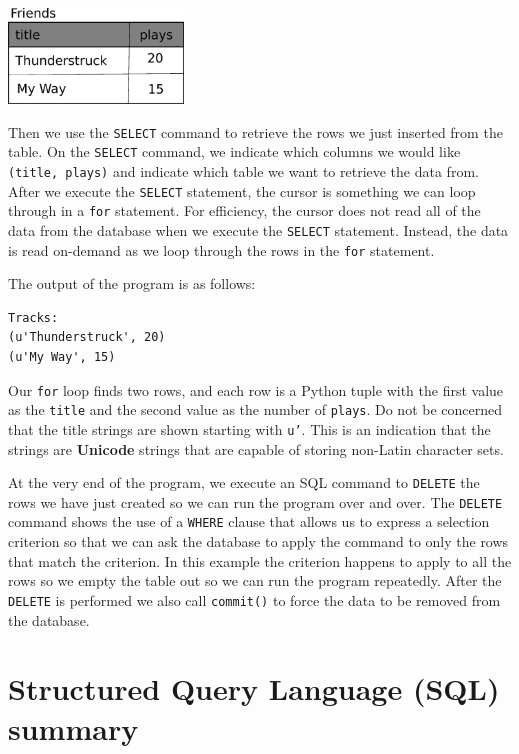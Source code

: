\documentclass[11pt]{book}
\begin{document}
\beforefig
\centerline{\includegraphics[height=1.00in]{figs2/tracks.eps}}
\afterfig

Then we use the {\tt SELECT} command
to retrieve the rows we just inserted from the table.  
On the 
{\tt SELECT} command, we indicate which columns we would like {\tt (title, plays)}
and indicate which table we want to retrieve the data from.  After we 
execute the {\tt SELECT} statement, the cursor is something we can loop through
in a {\tt for} statement.   For efficiency,
the cursor does not read all of the data from the
database when we execute the {\tt SELECT} statement.  
Instead, the data is read on-demand
as we loop through the rows in the {\tt for} statement.

The output of the program is as follows:

\beforeverb
\begin{verbatim}
Tracks:
(u'Thunderstruck', 20)
(u'My Way', 15)
\end{verbatim}
\afterverb
%
Our {\tt for} loop finds two rows, and each row is a Python tuple with the
first value as the {\tt title} and the second value as the number of {\tt plays}.
Do not be concerned that the title strings are shown starting with 
{\tt u'}.  This is an indication that the strings are {\bf Unicode} strings
that are capable of storing non-Latin character sets.

At the very end of the program, we execute an SQL command to {\tt DELETE} 
the rows we have just created so we can run the program over and over.
The {\tt DELETE} command shows the use of a {\tt WHERE} clause that
allows us to express a selection criterion so that we can ask the database
to apply the command to only the rows that match the criterion.  In this example
the criterion happens to apply to all the rows so we empty the table
out so we can run the program repeatedly.  After the {\tt DELETE} is performed
we also call {\tt commit()} to force the data to be removed from the database.

\section{Structured Query Language (SQL) summary}
\end{document}
